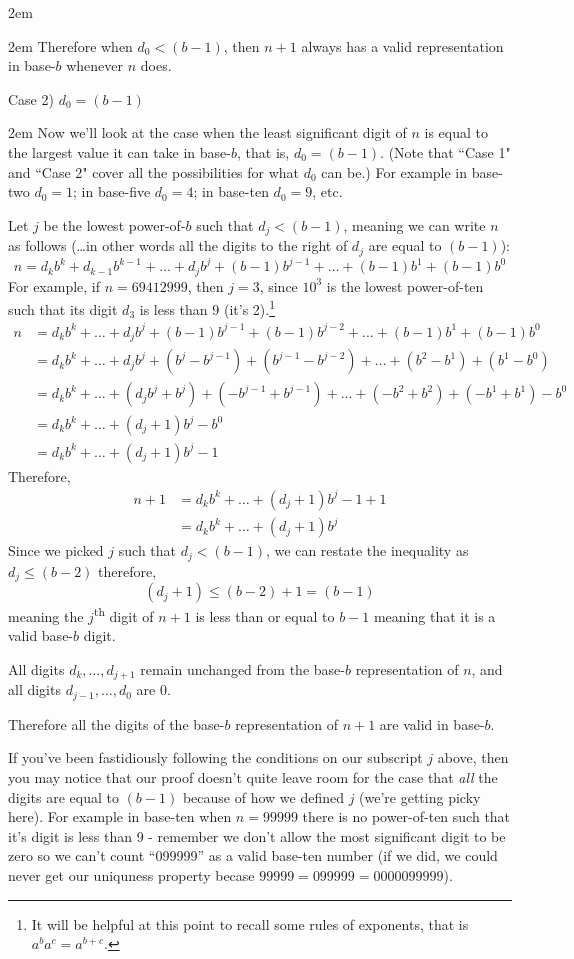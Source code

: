\documentclass{article}
\newenvironment{jprIn}{\begin{adjustwidth}{2em}{}}{\end{adjustwidth}}
\begin{document}
\begin{jprIn}
\begin{jprIn}
Therefore when $d_0<(b-1)$, then $n+1$ always has a valid representation in base-$b$ whenever $n$ does.
\end{jprIn}
\bigskip

Case 2) $d_0=(b-1)$
\begin{jprIn}
Now we'll look at the case when the least significant digit of $n$ is equal
to the largest value it can take in base-$b$, that is,
$d_0=(b-1)$.
(Note that  ``Case 1" and ``Case 2" cover all the possibilities for what $d_0$ can be.)
For example in base-two
$d_0=1$; in base-five
$d_0=4$; in base-ten $d_0=9$, etc.

Let $j$ be the lowest power-of-$b$ such that $d_j<(b-1)$,
meaning we can write $n$ as follows (\dots{}in other words all the digits to the right of $d_j$ are equal to $(b-1)$):
\[n = d_kb^k+d_{k-1}b^{k-1}+\dots+d_jb^j+(b-1)b^{j-1}+\dots+(b-1)b^1+(b-1)b^0\]
For example,
if $n=69412999$,
then $j=3$,
since $10^3$ is the lowest power-of-ten such that its digit $d_3$ is
less than 9 (it's 2).\footnote{It will
be helpful at this point to recall some rules of exponents, that is $a^ba^c=a^{b+c}$.}
\begin{align*}
n &=d_kb^k+\dots+d_jb^j+(b-1)b^{j-1}+(b-1)b^{j-2}+\dots+(b-1)b^1+(b-1)b^0\\
&= d_kb^k+\dots+d_jb^j+(b^j-b^{j-1})+(b^{j-1}-b^{j-2})+\dots+(b^2-b^1)+(b^1-b^0)\\
&= d_kb^k+\dots+(d_jb^j+b^j)+(-b^{j-1}+b^{j-1})+\dots+(-b^2+b^2)+(-b^1+b^1)-b^0\\
&= d_kb^k+\dots+(d_j+1)b^j-b^0\\
&= d_kb^k+\dots+(d_j+1)b^j-1
\end{align*}
Therefore,
\begin{align}
n+1 &=d_kb^k+\dots+(d_j+1)b^j-1+1 \nonumber \\
&= d_kb^k+\dots+(d_j+1)b^j \label{eqnA}
\end{align}
Since we picked $j$ such that $d_j<(b-1)$,
we can restate the inequality as\\
$d_j\le(b-2)$ therefore,
\[(d_j+1)\le(b-2)+1=(b-1)\]
meaning the $j$\textsuperscript{th} digit of $n+1$ is less than or equal to $b-1$ meaning that it is a valid base-$b$ digit.

All digits $d_k,\dots,{}d_{j+1}$ remain unchanged from the base-$b$ representation of $n$,
and all digits $d_{j-1},\dots{},d_0$ are 0.

Therefore all the digits of the base-$b$ representation of $n+1$ are valid in base-$b$.
\bigskip

If you've been fastidiously following the conditions on our subscript $j$ above, then
you may notice that
our proof doesn't quite leave room for the case
that \emph{all} the digits are equal to $(b-1)$ because of
how we defined $j$ (we're getting picky here).
For example in base-ten when $n=99999$ there is no power-of-ten such that
it's digit is less than 9 - remember we don't allow the most
significant digit to be zero so we can't count 
``099999'' as a valid base-ten number  (if we did, we
could never get our uniquness property becase $99999 = 099999 = 0000099999$).


\end{jprIn}
\end{jprIn}
\end{document}
